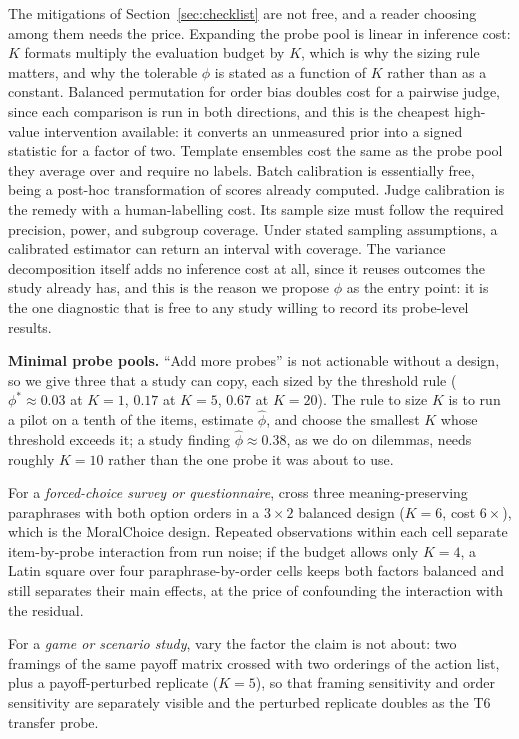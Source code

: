 \documentclass[11pt]{article}
\begin{document}
The mitigations of Section~\ref{sec:checklist} are not free, and a reader
choosing among them needs the price. Expanding the probe pool is linear in
inference cost: $K$ formats multiply the evaluation budget by $K$, which is why
the sizing rule matters, and why the tolerable $\phi$ is stated as a function of
$K$ rather than as a constant. Balanced permutation for order bias doubles cost
for a pairwise judge, since each comparison is run in both directions, and this
is the cheapest high-value intervention available: it converts an unmeasured
prior into a signed statistic for a factor of two. Template ensembles cost the
same as the probe pool they average over and require no labels. Batch
calibration is essentially free, being a post-hoc transformation of scores
already computed. Judge calibration is the remedy with a human-labelling cost.
Its sample size must follow the required precision, power, and subgroup
coverage. Under stated sampling assumptions, a calibrated estimator can return
an interval with coverage. The variance decomposition itself
adds no inference cost at all, since it reuses outcomes the study already has,
and this is the reason we propose $\phi$ as the entry point: it is the one
diagnostic that is free to any study willing to record its probe-level results.

\textbf{Minimal probe pools.} ``Add more probes'' is not actionable
without a design, so we give three that a study can copy, each sized by the
threshold rule ($\phi^\ast\approx0.03$ at $K=1$, $0.17$ at $K=5$, $0.67$ at
$K=20$). The rule to size $K$ is to run a pilot on a tenth of the items, estimate
$\hat\phi$, and choose the smallest $K$ whose threshold exceeds it; a study
finding $\hat\phi\approx0.38$, as we do on dilemmas, needs roughly $K=10$ rather
than the one probe it was about to use.

For a \emph{forced-choice survey or questionnaire}, cross three
meaning-preserving paraphrases with both option orders in a $3\times2$ balanced
design ($K=6$, cost $6\times$), which is the MoralChoice design. Repeated
observations within each cell separate item-by-probe interaction from run noise;
if the
budget allows only $K=4$, a Latin square over four paraphrase-by-order cells
keeps both factors balanced and still separates their main effects, at the price
of confounding the interaction with the residual.

For a \emph{game or scenario study}, vary the factor the claim is not about:
two framings of the same payoff matrix crossed with two orderings of the action
list, plus a payoff-perturbed replicate ($K=5$), so that framing sensitivity and
order sensitivity are separately visible and the perturbed replicate doubles as
the T6 transfer probe.
\end{document}
